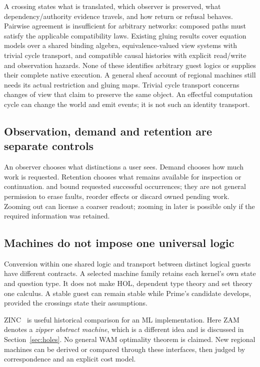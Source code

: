 \documentclass[11pt,a4paper]{article}
\newcommand{\code}[1]{\texttt{\detokenize{#1}}}
\begin{document}
A crossing states what is translated, which observer is preserved, what
dependency/authority evidence travels, and how return or refusal behaves.
Pairwise agreement is insufficient for arbitrary networks: composed paths
must satisfy the applicable compatibility laws. Existing gluing results cover
equation models over a shared binding algebra, equivalence-valued view systems
with trivial cycle transport, and compatible causal histories with explicit
read/write and observation hazards. None of these identifies arbitrary guest
logics or supplies their complete native execution. A general sheaf account of
regional machines still needs its actual restriction and gluing maps.
Trivial cycle transport concerns changes of view that claim to preserve the
same object. An effectful computation cycle can change the world and emit
events; it is not such an identity transport.

\subsection*{Observation, demand and retention are separate controls}
An observer chooses what distinctions a user sees. Demand chooses how much
work is requested. Retention chooses what remains available for inspection or
continuation. \code{once} and \code{select k} bound requested successful
occurrences; they are not general permission to erase faults, reorder effects
or discard owned pending work. Zooming out can license a coarser readout;
zooming in later is possible only if the required information was retained.

\subsection*{Machines do not impose one universal logic}
Conversion within one shared logic and transport between distinct logical
guests have different contracts. A selected machine family retains each
kernel's own state and question type. It does not make HOL, dependent type
theory and set theory one calculus. A stable guest can remain stable while
Prime's candidate develops, provided the crossings state their assumptions.

ZINC~\cite{ZINC} is useful historical comparison for an ML implementation.
Here ZAM denotes a \emph{zipper abstract machine}, which is a different idea
and is discussed in Section~\ref{sec:holes}. No general WAM optimality theorem
is claimed. New regional machines can be
derived or compared through these interfaces, then judged by correspondence
and an explicit cost model.
\end{document}
